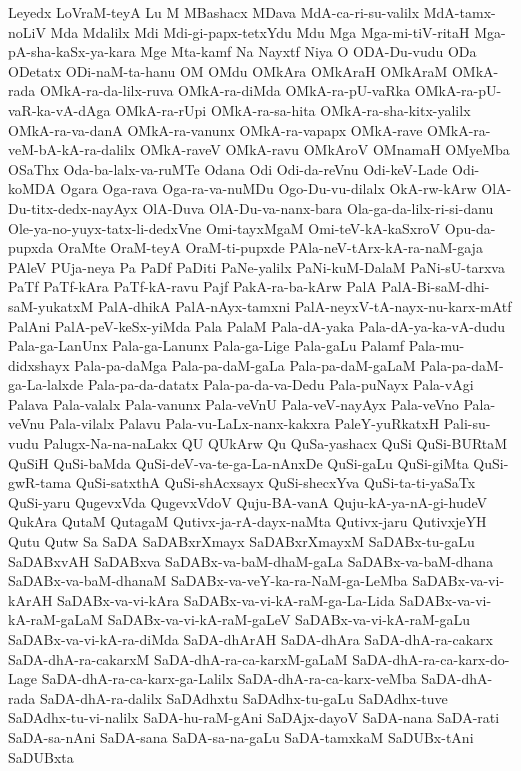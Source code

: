 {Leyedx
LoVraM-teyA
Lu
M
MBashacx
MDava
MdA-ca-ri-su-valilx
MdA-tamx-noLiV
Mda
Mdalilx
Mdi
Mdi-gi-papx-tetxYdu
Mdu
Mga
Mga-mi-tiV-ritaH
Mga-pA-sha-kaSx-ya-kara
Mge
Mta-kamf
Na
Nayxtf
Niya
O
ODA-Du-vudu
ODa
ODetatx
ODi-naM-ta-hanu
OM
OMdu
OMkAra
OMkAraH
OMkAraM
OMkA-rada
OMkA-ra-da-lilx-ruva
OMkA-ra-diMda
OMkA-ra-pU-vaRka
OMkA-ra-pU-vaR-ka-vA-dAga
OMkA-ra-rUpi
OMkA-ra-sa-hita
OMkA-ra-sha-kitx-yalilx
OMkA-ra-va-danA
OMkA-ra-vanunx
OMkA-ra-vapapx
OMkA-rave
OMkA-ra-veM-bA-kA-ra-dalilx
OMkA-raveV
OMkA-ravu
OMkAroV
OMnamaH
OMyeMba
OSaThx
Oda-ba-lalx-va-ruMTe
Odana
Odi
Odi-da-reVnu
Odi-keV-Lade
Odi-koMDA
Ogara
Oga-rava
Oga-ra-va-nuMDu
Ogo-Du-vu-dilalx
OkA-rw-kArw
OlA-Du-titx-dedx-nayAyx
OlA-Duva
OlA-Du-va-nanx-bara
Ola-ga-da-lilx-ri-si-danu
Ole-ya-no-yuyx-tatx-li-dedxVne
Omi-tayxMgaM
Omi-teV-kA-kaSxroV
Opu-da-pupxda
OraMte
OraM-teyA
OraM-ti-pupxde
PAla-neV-tArx-kA-ra-naM-gaja
PAleV
PUja-neya
Pa
PaDf
PaDiti
PaNe-yalilx
PaNi-kuM-DalaM
PaNi-sU-tarxva
PaTf
PaTf-kAra
PaTf-kA-ravu
Pajf
PakA-ra-ba-kArw
PalA
PalA-Bi-saM-dhi-saM-yukatxM
PalA-dhikA
PalA-nAyx-tamxni
PalA-neyxV-tA-nayx-nu-karx-mAtf
PalAni
PalA-peV-keSx-yiMda
Pala
PalaM
Pala-dA-yaka
Pala-dA-ya-ka-vA-dudu
Pala-ga-LanUnx
Pala-ga-Lanunx
Pala-ga-Lige
Pala-gaLu
Palamf
Pala-mu-didxshayx
Pala-pa-daMga
Pala-pa-daM-gaLa
Pala-pa-daM-gaLaM
Pala-pa-daM-ga-La-lalxde
Pala-pa-da-datatx
Pala-pa-da-va-Dedu
Pala-puNayx
Pala-vAgi
Palava
Pala-valalx
Pala-vanunx
Pala-veVnU
Pala-veV-nayAyx
Pala-veVno
Pala-veVnu
Pala-vilalx
Palavu
Pala-vu-LaLx-nanx-kakxra
PaleY-yuRkatxH
Pali-su-vudu
Palugx-Na-na-naLakx
QU
QUkArw
Qu
QuSa-yashacx
QuSi
QuSi-BURtaM
QuSiH
QuSi-baMda
QuSi-deV-va-te-ga-La-nAnxDe
QuSi-gaLu
QuSi-giMta
QuSi-gwR-tama
QuSi-satxthA
QuSi-shAcxsayx
QuSi-shecxYva
QuSi-ta-ti-yaSaTx
QuSi-yaru
QugevxVda
QugevxVdoV
Quju-BA-vanA
Quju-kA-ya-nA-gi-hudeV
QukAra
QutaM
QutagaM
Qutivx-ja-rA-dayx-naMta
Qutivx-jaru
QutivxjeYH
Qutu
Qutw
Sa
SaDA
SaDABxrXmayx
SaDABxrXmayxM
SaDABx-tu-gaLu
SaDABxvAH
SaDABxva
SaDABx-va-baM-dhaM-gaLa
SaDABx-va-baM-dhana
SaDABx-va-baM-dhanaM
SaDABx-va-veY-ka-ra-NaM-ga-LeMba
SaDABx-va-vi-kArAH
SaDABx-va-vi-kAra
SaDABx-va-vi-kA-raM-ga-La-Lida
SaDABx-va-vi-kA-raM-gaLaM
SaDABx-va-vi-kA-raM-gaLeV
SaDABx-va-vi-kA-raM-gaLu
SaDABx-va-vi-kA-ra-diMda
SaDA-dhArAH
SaDA-dhAra
SaDA-dhA-ra-cakarx
SaDA-dhA-ra-cakarxM
SaDA-dhA-ra-ca-karxM-gaLaM
SaDA-dhA-ra-ca-karx-do-Lage
SaDA-dhA-ra-ca-karx-ga-Lalilx
SaDA-dhA-ra-ca-karx-veMba
SaDA-dhA-rada
SaDA-dhA-ra-dalilx
SaDAdhxtu
SaDAdhx-tu-gaLu
SaDAdhx-tuve
SaDAdhx-tu-vi-nalilx
SaDA-hu-raM-gAni
SaDAjx-dayoV
SaDA-nana
SaDA-rati
SaDA-sa-nAni
SaDA-sana
SaDA-sa-na-gaLu
SaDA-tamxkaM
SaDUBx-tAni
SaDUBxta
}

